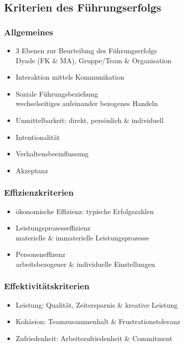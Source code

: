 \documentclass{cheatsheet}
\begin{document}
    \subsection{Kriterien des Führungserfolgs}
    \begin{normbox}{\subsubsection{Allgemeines}}
        \begin{itemize}
            \item 3 Ebenen zur Beurteilung des Führungserfolgs\\
            \ra Dyade (FK \& MA), Gruppe/Team \& Organisation
            \item Interaktion mittels Kommunikation
            \item Soziale Führungsbeziehung\\
            \ra wechselseitiges aufeinander bezogenes Handeln
            \item Unmittelbarkeit: direkt, persönlich \& individuell
            \item Intentionalität
            \item Verhaltensbeeinflussung
            \item Akzeptanz
        \end{itemize}
    \end{normbox}
    \begin{normbox}{\subsubsection{Effizienzkriterien}}
        \begin{itemize}
            \item ökonomische Effizienz: typische Erfolgszahlen
            \item Leistungsprozesseffizienz\\
            \ra materielle \& immaterielle Leistungsprozesse
            \item Personeneffizenz\\
            \ra arbeitsbezogener \& individuelle Einstellungen
        \end{itemize}
    \end{normbox}
    \begin{normbox}{\subsubsection{Effektivitätskriterien}}
        \begin{itemize}
            \item Leistung: Qualität, Zeitersparnis \& kreative Leistung
             \item Kohäsion: Teamzusammenhalt \& Frustrationstoleranz
             \item Zufriedenheit: Arbeitszufriedenheit \& Commitment
        \end{itemize}
    \end{normbox}
\end{document}
